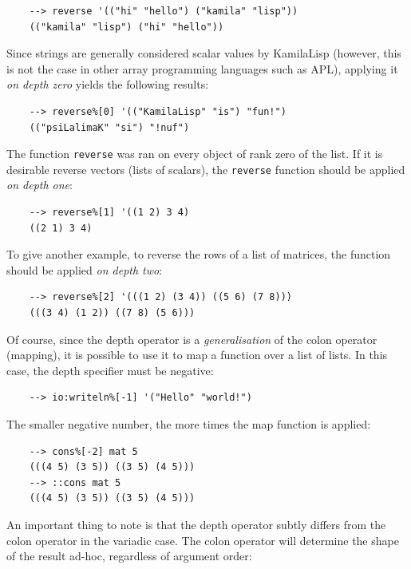\begin{Verbatim}
    --> reverse '(("hi" "hello") ("kamila" "lisp"))
    (("kamila" "lisp") ("hi" "hello"))
\end{Verbatim}

Since strings are generally considered scalar values by KamilaLisp (however, this is not the case in other array programming languages such as APL), applying it \textit{on depth zero} yields the following results:

\begin{Verbatim}
    --> reverse%[0] '(("KamilaLisp" "is") "fun!")
    (("psiLalimaK" "si") "!nuf")
\end{Verbatim}

The function \verb|reverse| was ran on every object of rank zero of the list. If it is desirable reverse vectors (lists of scalars), the \verb|reverse| function should be applied \textit{on depth one}:

\begin{Verbatim}
    --> reverse%[1] '((1 2) 3 4)
    ((2 1) 3 4)
\end{Verbatim}

To give another example, to reverse the rows of a list of matrices, the function should be applied \textit{on depth two}:

\begin{Verbatim}
    --> reverse%[2] '(((1 2) (3 4)) ((5 6) (7 8)))
    (((3 4) (1 2)) ((7 8) (5 6)))
\end{Verbatim}

Of course, since the depth operator is a \textit{generalisation} of the colon operator (mapping), it is possible to use it to map a function over a list of lists. In this case, the depth specifier must be negative:

\begin{Verbatim}
    --> io:writeln%[-1] '("Hello" "world!")
\end{Verbatim}

The smaller negative number, the more times the map function is applied:

\begin{Verbatim}
    --> cons%[-2] mat 5
    (((4 5) (3 5)) ((3 5) (4 5)))
    --> ::cons mat 5
    (((4 5) (3 5)) ((3 5) (4 5)))
\end{Verbatim}

An important thing to note is that the depth operator subtly differs from the colon operator in the variadic case. The colon operator will determine the shape of the result ad-hoc, regardless of argument order:

